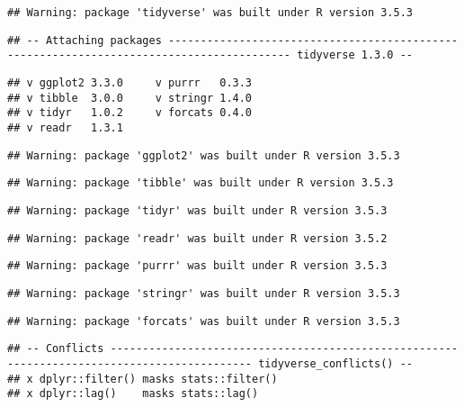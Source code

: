 \documentclass[]{article}
\begin{document}
\begin{verbatim}
## Warning: package 'tidyverse' was built under R version 3.5.3
\end{verbatim}

\begin{verbatim}
## -- Attaching packages ----------------------------------------------------------------------------------------- tidyverse 1.3.0 --
\end{verbatim}

\begin{verbatim}
## v ggplot2 3.3.0     v purrr   0.3.3
## v tibble  3.0.0     v stringr 1.4.0
## v tidyr   1.0.2     v forcats 0.4.0
## v readr   1.3.1
\end{verbatim}

\begin{verbatim}
## Warning: package 'ggplot2' was built under R version 3.5.3
\end{verbatim}

\begin{verbatim}
## Warning: package 'tibble' was built under R version 3.5.3
\end{verbatim}

\begin{verbatim}
## Warning: package 'tidyr' was built under R version 3.5.3
\end{verbatim}

\begin{verbatim}
## Warning: package 'readr' was built under R version 3.5.2
\end{verbatim}

\begin{verbatim}
## Warning: package 'purrr' was built under R version 3.5.3
\end{verbatim}

\begin{verbatim}
## Warning: package 'stringr' was built under R version 3.5.3
\end{verbatim}

\begin{verbatim}
## Warning: package 'forcats' was built under R version 3.5.3
\end{verbatim}

\begin{verbatim}
## -- Conflicts -------------------------------------------------------------------------------------------- tidyverse_conflicts() --
## x dplyr::filter() masks stats::filter()
## x dplyr::lag()    masks stats::lag()
\end{verbatim}
\end{document}
